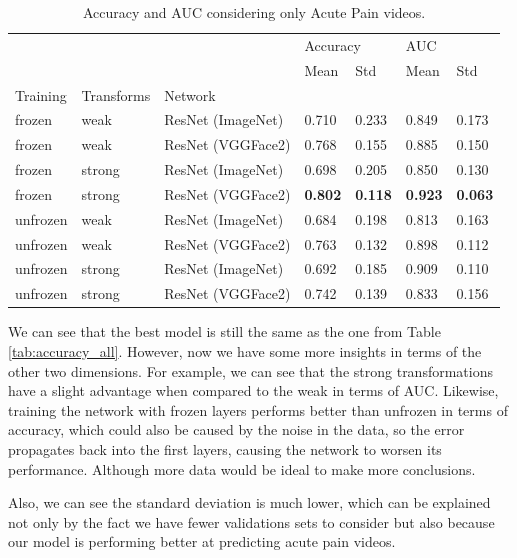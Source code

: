\begin{table}[h!tp]
\centering
\caption{Accuracy and AUC considering only Acute Pain videos.}
\label{tab:accuracy_auc_ap} 
\begin{tabular}{lllllll}
\toprule
         &        &          & \multicolumn{2}{l}{Accuracy} & \multicolumn{2}{l}{AUC} \\
         &        &          &      Mean &       Std &      Mean &       Std \\
Training & Transforms & Network &           &           &           &           \\
\midrule
frozen   & weak   & ResNet (ImageNet) &  0.710 &  0.233 &  0.849 &  0.173 \\
frozen   & weak   & ResNet (VGGFace2) &  0.768 &  0.155 &  0.885 &  0.150 \\
frozen   & strong & ResNet (ImageNet) &  0.698 &  0.205 &  0.850 &  0.130 \\
frozen   & strong & ResNet (VGGFace2) &  \textbf{0.802} & \textbf{ 0.118} &  \textbf{0.923} &  \textbf{0.063} \\
unfrozen & weak   & ResNet (ImageNet) &  0.684 &  0.198 &  0.813 &  0.163 \\
unfrozen & weak   & ResNet (VGGFace2) &  0.763 &  0.132 &  0.898 &  0.112 \\
unfrozen & strong & ResNet (ImageNet) &  0.692 &  0.185 &  0.909 &  0.110 \\
unfrozen & strong & ResNet (VGGFace2) &  0.742 &  0.139 &  0.833 &  0.156 \\
\bottomrule
\end{tabular}
\end{table}

We can see that the best model is still the same as the one from Table \ref{tab:accuracy_all}. However, now we have some more insights in terms of the other two dimensions. For example, we can see that the strong transformations have a slight advantage when compared to the weak in terms of AUC. Likewise, training the network with frozen layers performs better than unfrozen in terms of accuracy, which could also be caused by the noise in the data, so the error propagates back into the first layers, causing the network to worsen its performance. Although more data would be ideal to make more conclusions.

Also, we can see the standard deviation is much lower, which can be explained not only by the fact we have fewer validations sets to consider but also because our model is performing better at predicting acute pain videos.

